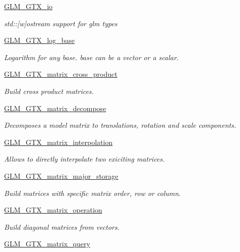 \begin{DoxyCompactItemize}
\hyperlink{group__gtx__io}{G\+L\+M\+\_\+\+G\+T\+X\+\_\+io}
\begin{DoxyCompactList}\small\item\em std\+:\+:\mbox{[}w\mbox{]}ostream support for glm types \end{DoxyCompactList}\item 
\hyperlink{group__gtx__log__base}{G\+L\+M\+\_\+\+G\+T\+X\+\_\+log\+\_\+base}
\begin{DoxyCompactList}\small\item\em Logarithm for any base. base can be a vector or a scalar. \end{DoxyCompactList}\item 
\hyperlink{group__gtx__matrix__cross__product}{G\+L\+M\+\_\+\+G\+T\+X\+\_\+matrix\+\_\+cross\+\_\+product}
\begin{DoxyCompactList}\small\item\em Build cross product matrices. \end{DoxyCompactList}\item 
\hyperlink{group__gtx__matrix__decompose}{G\+L\+M\+\_\+\+G\+T\+X\+\_\+matrix\+\_\+decompose}
\begin{DoxyCompactList}\small\item\em Decomposes a model matrix to translations, rotation and scale components. \end{DoxyCompactList}\item 
\hyperlink{group__gtx__matrix__interpolation}{G\+L\+M\+\_\+\+G\+T\+X\+\_\+matrix\+\_\+interpolation}
\begin{DoxyCompactList}\small\item\em Allows to directly interpolate two exiciting matrices. \end{DoxyCompactList}\item 
\hyperlink{group__gtx__matrix__major__storage}{G\+L\+M\+\_\+\+G\+T\+X\+\_\+matrix\+\_\+major\+\_\+storage}
\begin{DoxyCompactList}\small\item\em Build matrices with specific matrix order, row or column. \end{DoxyCompactList}\item 
\hyperlink{group__gtx__matrix__operation}{G\+L\+M\+\_\+\+G\+T\+X\+\_\+matrix\+\_\+operation}
\begin{DoxyCompactList}\small\item\em Build diagonal matrices from vectors. \end{DoxyCompactList}\item 
\hyperlink{group__gtx__matrix__query}{G\+L\+M\+\_\+\+G\+T\+X\+\_\+matrix\+\_\+query}

\end{DoxyCompactItemize}
